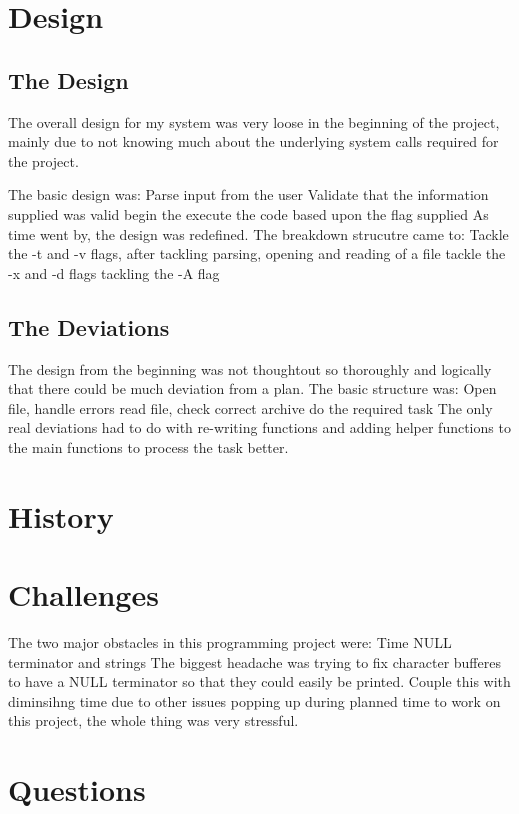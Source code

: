 \documentclass[letterpaper,10pt,titlepage]{article}
\begin{document}
\section{Design}
\label{System Design & Deviations}

\subsection{The Design}
\label{DesingProcess}
The overall design for my system was very loose in the beginning of the project, mainly due to not knowing much about the
underlying system calls required for the project.

The basic design was:
	Parse input from the user
	Validate that the information supplied was valid
	begin the execute the code based upon the flag supplied
As time went by, the design was redefined. The breakdown strucutre came to:
	Tackle the -t and -v flags, after tackling parsing, opening and reading of a file
	tackle the -x and -d flags
	tackling the -A flag
\subsection{The Deviations}
\label{Deviations}
The design from the beginning was not thoughtout so thoroughly and logically that there could be much deviation from a plan. The basic structure was:
	Open file, handle errors
	read file, check correct archive
	do the required task
The only real deviations had to do with re-writing functions and adding helper functions to the main functions to process the task better.
\section{History}
\label{myar Revision History}


\section{Challenges}
\label{Overcoming Project challenges}
The two major obstacles in this programming project were:
	Time
	NULL terminator and strings
The biggest headache was trying to fix character bufferes to have a NULL terminator so that they could easily be printed. Couple this with diminsihng time due to other issues popping up during planned time to work on this project, the whole thing was very stressful.

\section{Questions}
\label{Project Quesions}
\end{document}
